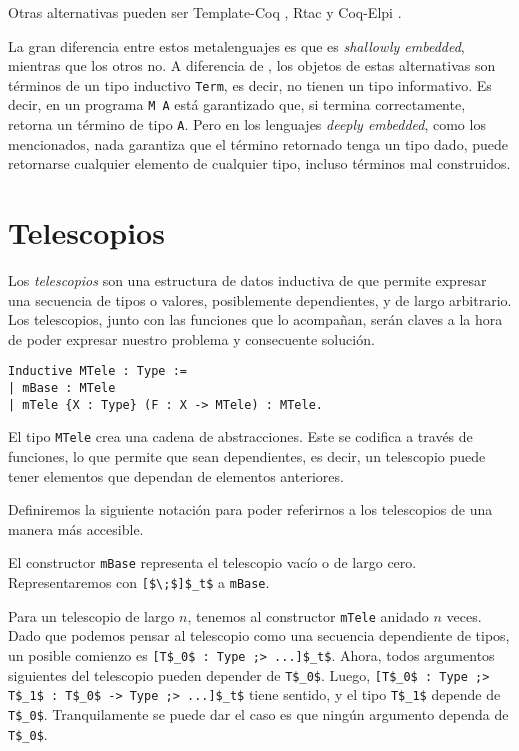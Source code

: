 Otras alternativas pueden ser Template-Coq \cite{DBLP:conf/itp/AnandBCST18}, Rtac \cite{DBLP:conf/esop/MalechaB16} y Coq-Elpi \cite{tassi:hal-01637063}.

La gran diferencia entre estos metalenguajes es que \Mtac es \emph{shallowly embedded}, mientras que los otros no. A diferencia de \Mtac, los objetos de estas alternativas son términos de un tipo inductivo \lstinline{Term}, es decir, no tienen un tipo informativo. Es decir, en \Mtac un programa \lstinline{M A} está garantizado que, si termina correctamente, retorna un término de tipo \lstinline{A}. Pero en los lenguajes \emph{deeply embedded}, como los mencionados, nada garantiza que el término retornado tenga un tipo dado, puede retornarse cualquier elemento de cualquier tipo, incluso términos mal construidos.

\section{Telescopios}

Los \emph{telescopios} son una estructura de datos inductiva de \Mtac que permite expresar una secuencia de tipos o valores, posiblemente dependientes, y de largo arbitrario.
Los telescopios, junto con las funciones que lo acompañan, serán claves a la hora de poder expresar nuestro problema y consecuente solución.

\begin{lstlisting}[float=h,frame=tb,caption={Definicion de telescopio},label=lst:MTele]
Inductive MTele : Type :=
| mBase : MTele
| mTele {X : Type} (F : X -> MTele) : MTele.
\end{lstlisting}

El tipo \lstinline{MTele} crea una cadena de abstracciones.
Este se codifica a través de funciones, lo que permite que sean dependientes, es decir, un telescopio puede tener elementos que dependan de elementos anteriores.

Definiremos la siguiente notación para poder referirnos a los telescopios de una manera más accesible.

El constructor \lstinline{mBase} representa el telescopio vacío o de largo cero. Representaremos con \lstinline{[$\;$]$_t$} a \lstinline{mBase}.

Para un telescopio de largo $n$, tenemos al constructor \lstinline{mTele} anidado $n$ veces. Dado que podemos pensar al telescopio como una secuencia dependiente de tipos, un posible comienzo es \lstinline{[T$_0$ : Type ;> ...]$_t$}. Ahora, todos argumentos siguientes del telescopio pueden depender de \lstinline{T$_0$}. Luego, \lstinline{[T$_0$ : Type ;> T$_1$ : T$_0$ -> Type ;> ...]$_t$} tiene sentido, y el tipo \lstinline{T$_1$} depende de \lstinline{T$_0$}. Tranquilamente se puede dar el caso es que ningún argumento dependa de \lstinline{T$_0$}.

